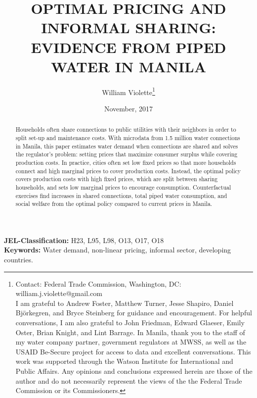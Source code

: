 \documentclass[12pt]{article}
\title{OPTIMAL PRICING AND INFORMAL SHARING: \\ EVIDENCE FROM PIPED WATER IN MANILA}
\author{William Violette\thanks{Contact: Federal Trade Commission, Washington, DC: william.j.violette@gmail.com \\ I am grateful to Andrew Foster, Matthew Turner, Jesse Shapiro, Daniel Bj\"{o}rkegren, and Bryce Steinberg for guidance and encouragement.  For helpful conversations, I am also grateful to John Friedman, Edward Glaeser, Emily Oster, Brian Knight, and Lint Barrage.  In Manila, thank you to the staff of my water company partner, government regulators at MWSS, as well as the USAID Be-Secure project for access to data and excellent conversations.  This work was supported through the Watson Institute for International and Public Affairs.  Any opinions and conclusions expressed herein are those of the author and do not necessarily represent the views of the the Federal Trade Commission or its Commissioners.}
 }
\date{November, 2017}
\begin{document}
\maketitle
\begin{abstract}




	Households often share connections to public utilities with their neighbors in order to split set-up and maintenance costs.  With microdata from 1.5 million water connections in Manila, this paper estimates water demand when connections are shared and solves the regulator's problem: setting prices that maximize consumer surplus while covering production costs.  In practice, cities often set low fixed prices so that more households connect and high marginal prices to cover production costs.  Instead, the optimal policy covers production costs with high fixed prices, which are split between sharing households, and sets low marginal prices to encourage consumption.  Counterfactual exercises find increases in shared connections, total piped water consumption, and social welfare from the optimal policy compared to current prices in Manila.







\end{abstract} 
\vspace{1cm}
{\bf JEL-Classification:} H23, L95, L98, O13, O17, O18 \\
\vspace{.1cm}
{\bf Keywords:} Water demand, non-linear pricing, informal sector, developing countries. 
\end{document}

